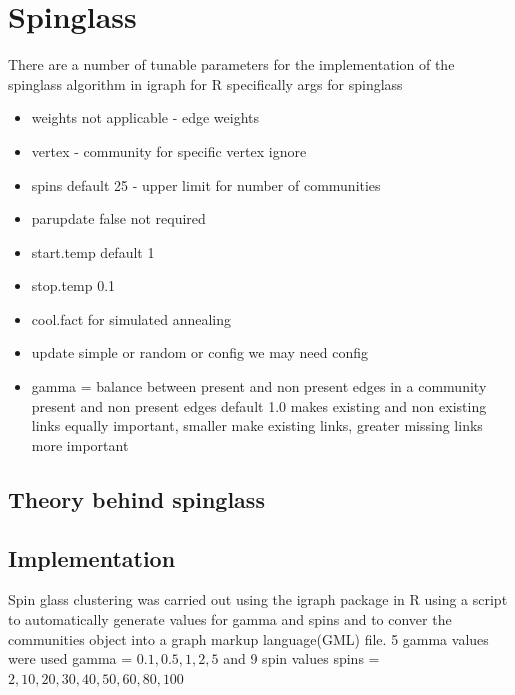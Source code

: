\section{Spinglass}
\label{sec: Spinglass description}
There are a number of tunable parameters for the implementation of the spinglass algorithm in igraph for R specifically
args for spinglass
\begin{itemize}
    \item{weights not applicable - edge weights}
    \item vertex - community for specific vertex ignore
    \item spins default 25 - upper limit for number of communities
    \item parupdate false not required
    \item start.temp default 1
    
    \item stop.temp 0.1
    \item cool.fact for simulated annealing
    \item update simple or random or config we may need config
    \item gamma = balance between present and non present edges in a community present and non present edges default 1.0 makes existing and non existing links equally important, smaller make existing links, greater missing links more important
\end{itemize}











\subsection{Theory behind spinglass}

\subsection{Implementation}
Spin glass clustering was carried out using the igraph package in R using a script to automatically generate values for gamma and spins and to conver the communities object into a graph markup language(GML) file. 5 gamma values were used gamma = $0.1,0.5,1,2,5$ and 9 spin values spins = $2,10,20,30,40,50,60,80,100$ 

